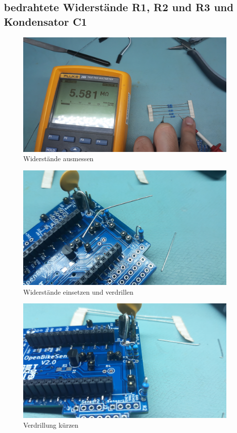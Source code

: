 \documentclass[12pt, a4paper]{article}		%
\begin{document}
\subsection{bedrahtete Widerstände R1, R2 und R3 und Kondensator C1}

\begin{figure}[H]
	\centering
		\includegraphics[width=0.99\textwidth]{Grafiken/20200726_180343.jpg}
	\caption{Widerstände ausmessen}
	\label{fig:20200726_180343}
\end{figure}

\begin{figure}[H]
	\centering
		\includegraphics[width=0.99\textwidth]{Grafiken/20200726_180708.jpg}
	\caption{Widerstände einsetzen und verdrillen}
	\label{fig:20200726_180708}
\end{figure}

\begin{figure}[H]
	\centering
		\includegraphics[width=0.99\textwidth]{Grafiken/20200726_180727.jpg}
	\caption{Verdrillung kürzen}
	\label{fig:20200726_180727}
\end{figure}
\end{document}
